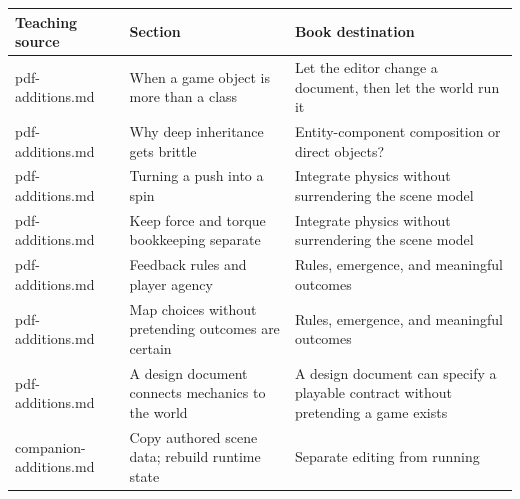{\def\LTcaptype{none} %
\begin{longtable}[]{@{}
  >{\raggedright\arraybackslash}p{}
  >{\raggedright\arraybackslash}p{}
  >{\raggedright\arraybackslash}p{}@{}}
\toprule\noalign{}
\begin{minipage}[b]{\linewidth}\raggedright
Teaching source
\end{minipage} & \begin{minipage}[b]{\linewidth}\raggedright
Section
\end{minipage} & \begin{minipage}[b]{\linewidth}\raggedright
Book destination
\end{minipage} \\
\midrule\noalign{}
\endhead
\bottomrule\noalign{}
\endlastfoot
pdf-additions.md & When a game object is more than a class & Let the editor change a document, then let the world run it \\
pdf-additions.md & Why deep inheritance gets brittle & Entity-component composition or direct objects? \\
pdf-additions.md & Turning a push into a spin & Integrate physics without surrendering the scene model \\
pdf-additions.md & Keep force and torque bookkeeping separate & Integrate physics without surrendering the scene model \\
pdf-additions.md & Feedback rules and player agency & Rules, emergence, and meaningful outcomes \\
pdf-additions.md & Map choices without pretending outcomes are certain & Rules, emergence, and meaningful outcomes \\
pdf-additions.md & A design document connects mechanics to the world & A design document can specify a playable contract without pretending a game exists \\
companion-additions.md & Copy authored scene data; rebuild runtime state & Separate editing from running \\
\end{longtable}
}

